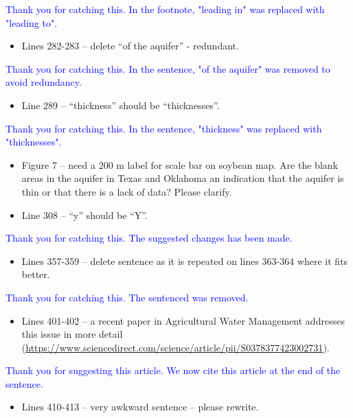 \documentclass[
]{article}
\providecommand{\tightlist}{%
  \setlength{\itemsep}{0pt}\setlength{\parskip}{0pt}}
\begin{document}
\textcolor{blue}{Thank you for catching this. In the footnote, "leading in" was replaced with "leading to".}

\begin{itemize}
\tightlist
\item
  Lines 282-283 -- delete ``of the aquifer'' - redundant.
\end{itemize}

\textcolor{blue}{Thank you for catching this. In the sentence, "of the aquifer" was removed to avoid redundancy.}

\begin{itemize}
\tightlist
\item
  Line 289 -- ``thickness'' should be ``thicknesses''.
\end{itemize}

\textcolor{blue}{Thank you for catching this. In the sentence, "thickness" was replaced with "thicknesses".}

\begin{itemize}
\item
  Figure 7 -- need a 200 m label for scale bar on soybean map. Are the
  blank areas in the aquifer in Texas and Oklahoma an indication that
  the aquifer is thin or that there is a lack of data? Please clarify.
\item
  Line 308 -- ``y'' should be ``Y''.
\end{itemize}

\textcolor{blue}{Thank you for catching this. The suggested changes has been made.}

\begin{itemize}
\tightlist
\item
  Lines 357-359 -- delete sentence as it is repeated on lines 363-364
  where it fits better.
\end{itemize}

\textcolor{blue}{Thank you for catching this. The sentenced was removed.}

\begin{itemize}
\tightlist
\item
  Lines 401-402 -- a recent paper in Agricultural Water Management
  addresses this issue in more detail
  (\url{https://www.sciencedirect.com/science/article/pii/S0378377423002731}).
\end{itemize}

\textcolor{blue}{Thank you for suggesting this article. We now cite this article at the end of the sentence.}

\begin{itemize}
\tightlist
\item
  Lines 410-413 -- very awkward sentence -- please rewrite.
\end{itemize}
\end{document}
